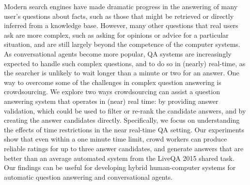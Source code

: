 Modern search engines have made dramatic progress in the answering of many user's questions about facts, such as those that might be retrieved or directly inferred from a knowledge base. However, many other questions that real users ask are more complex, such as asking for opinions or advice for a particular situation, and are still largely beyond the competence of the computer systems. As conversational agents become more popular, QA systems are increasingly expected to handle such complex questions, and to do so in (nearly) real-time, as the searcher is unlikely to wait longer than a minute or two for an answer. One way to overcome some of the challenges in complex question answering is crowdsourcing. We explore two ways crowdsourcing can assist a question answering system that operates in (near) real time: by providing answer validation, which could be used to filter or re-rank the candidate answers, and by creating the answer candidates directly. Specifically, we focus on understanding the effects of time restrictions in the near real-time QA setting. Our experiments show that even within a one minute time limit, crowd workers can produce reliable ratings for up to three answer candidates, and generate answers that are better than an average automated system from the LiveQA 2015 shared task. Our findings can be useful for developing hybrid human-computer systems for automatic question answering and conversational agents.

